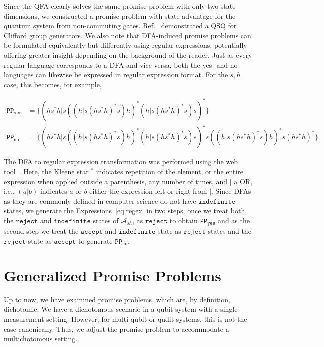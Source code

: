 \documentclass[../main.tex]{subfiles}
\begin{document}
Since the QFA clearly solves the same promise problem with only two state dimensions, we constructed a promise problem with state advantage for the quantum system from non-commuting gates. Ref.~\cite{noller2024classical} demonstrated a QSQ for Clifford group generators.
We also note that DFA-induced promise problems can be formulated equivalently but differently using regular expressions, potentially offering greater insight depending on the background of the reader. Just as every regular language corresponds to a DFA and vice versa, both the yes- and no-languages can likewise be expressed in regular expression format. For the ${s,h}$ case, this becomes, for example,

\begin{align}\label{eq:regex}
    \mathtt{PP_{yes}} &= \{(hs^*h|s((h|s(hs^*h)^*s)h)^*(h|s(hs^*h)^*s)s)^*\} \\
    \mathtt{PP_{no}} &= \{(hs^*h|s((h|s(hs^*h)^*s)h)^*(h|s(hs^*h)^*s)s)^*s((h|s(hs^*h)^*s)h)^*s(hs^*h)^*\}.
\end{align}   

The DFA to regular expression transformation was performed using the web tool~\cite{ivan2024fsm2regex}. Here, the Kleene star $^*$ indicates repetition of the element, or the entire expression when applied outside a parenthesis, any number of times, and $|$ a OR, i.e., $(a|b)$ indicates $a$ or $b$ either the expression left or right from $|$. Since DFAs as they are commonly defined in computer science do not have $\mathtt{indefinite}$ states, we generate the Expressions~\ref{eq:regex} in two steps, once we treat both, the $\mathtt{reject}$  and $\mathtt{indefinite}$ states of $\mathcal{A}_{sh}$, as $\mathtt{reject}$  to obtain $\mathtt{PP_{yes}}$ and as the second step we treat the $\mathtt{accept}$ and $\mathtt{indefinite}$ state as $\mathtt{reject}$  states and the $\mathtt{reject}$  state as $\mathtt{accept}$ to generate $\mathtt{PP_{no}}$.


\section{Generalized Promise Problems}

Up to now, we have examined promise problems, which are, by definition, dichotomic. We have a dichotomous scenario in a qubit system with a single measurement setting. However, for multi-qubit or qudit systems, this is not the case canonically. Thus, we adjust the promise problem to accommodate a multichotomous setting.
\end{document}
